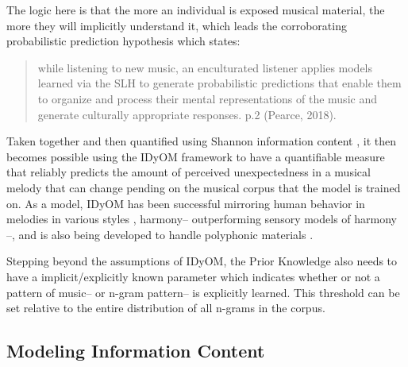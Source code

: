 \documentclass[12pt,]{book}
\begin{document}
The logic here is that the more an individual is exposed musical material, the more they will implicitly understand it, which leads the corroborating probabilistic prediction hypothesis which states:

\begin{quote}
while listening to new music, an enculturated listener applies models learned via the SLH to generate probabilistic predictions that enable them to organize and process their mental representations of the music and generate culturally appropriate responses. p.2 (Pearce, 2018).
\end{quote}

Taken together and then quantified using Shannon information content \citep{shannonMathematicalTheoryCommunication1948}, it then becomes possible using the IDyOM framework to have a quantifiable measure that reliably predicts the amount of perceived unexpectedness in a musical melody that can change pending on the musical corpus that the model is trained on.
As a model, IDyOM has been successful mirroring human behavior in melodies in various styles \citep{pearceStatisticalLearningProbabilistic2018a}, harmony-- outperforming \citep{harrisonDissociatingSensoryCognitive2018} sensory models of harmony \citep{bigandEmpiricalEvidenceMusical2014}--, and is also being developed to handle polyphonic materials \citep{sauvePredictionPolyphonyModelling2017}.

Stepping beyond the assumptions of IDyOM, the Prior Knowledge also needs to have a implicit/explicitly known parameter which indicates whether or not a pattern of music-- or n-gram pattern-- is explicitly learned.
This threshold can be set relative to the entire distribution of all n-grams in the corpus.

\hypertarget{modeling-information-content}{%
\subsection{Modeling Information Content}\label{modeling-information-content}}
\end{document}
